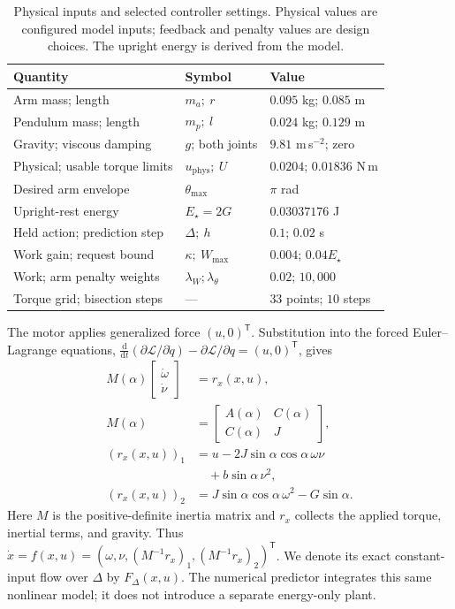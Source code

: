 \documentclass[letterpaper,10pt,conference]{ieeeconf}
\newcommand{\Estar}{E_{\star}}
\newcommand{\dd}{\mathrm{d}}
\begin{document}
\begin{table}[t]
\centering\small
\caption{Physical inputs and selected controller settings. Physical values are configured model inputs; feedback and penalty values are design choices. The upright energy is derived from the model.}
\label{tab:parameters}
\begin{tabular}{lll}
\toprule Quantity & Symbol & Value \\
\midrule Arm mass; length & $m_a;\ r$ & $0.095$ kg; $0.085$ m \\
Pendulum mass; length & $m_p;\ l$ & $0.024$ kg; $0.129$ m \\
Gravity; viscous damping & $g$; both joints & $9.81$ m\,s$^{-2}$; zero \\
Physical; usable torque limits & $u_{\mathrm{phys}};\ U$ & $0.0204$; $0.01836$ N\,m \\
Desired arm envelope & $\theta_{\max}$ & $\pi$ rad \\
Upright-rest energy & $\Estar=2G$ & $0.03037176$ J \\
Held action; prediction step & $\Delta;\ h$ & $0.1$; $0.02$ s \\
Work gain; request bound & $\kappa;\ W_{\max}$ & $0.004$; $0.04\Estar$ \\
Work; arm penalty weights & $\lambda_W;\lambda_\theta$ & $0.02$; $10{,}000$ \\
Torque grid; bisection steps & --- & $33$ points; $10$ steps \\
\bottomrule
\end{tabular}
\end{table}

The motor applies generalized force $(u,0)^{\mathsf T}$. Substitution into the forced Euler--Lagrange equations, $\frac{\dd}{\dd t}(\partial\mathcal L/\partial\dot q)-\partial\mathcal L/\partial q=(u,0)^{\mathsf T}$, gives
\begin{equation}
\begin{aligned}
 M(\alpha)\begin{bmatrix}\dot\omega\\\dot\nu\end{bmatrix}&=r_x(x,u),\\
 M(\alpha)&=\begin{bmatrix}A(\alpha)&C(\alpha)\\C(\alpha)&J\end{bmatrix},\\
 (r_x(x,u))_1&=u-2J\sin\alpha\cos\alpha\,\omega\nu\\
             &\quad+b\sin\alpha\,\nu^2,\\
 (r_x(x,u))_2&=J\sin\alpha\cos\alpha\,\omega^2-G\sin\alpha.
\end{aligned}
\label{eq:dynamics}
\end{equation}
Here $M$ is the positive-definite inertia matrix and $r_x$ collects the applied torque, inertial terms, and gravity. Thus $\dot x=f(x,u)=(\omega,\nu,(M^{-1}r_x)_1,(M^{-1}r_x)_2)^{\mathsf T}$. We denote its exact constant-input flow over $\Delta$ by $F_\Delta(x,u)$. The numerical predictor integrates this same nonlinear model; it does not introduce a separate energy-only plant.
\end{document}
